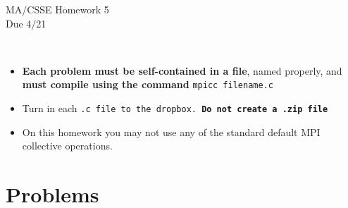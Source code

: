 \documentclass{article}
\begin{document}
\begin{center}
\Large{MA/CSSE Homework 5}\\
Due 4/21
\end{center}
\vspace{.25in}
\\
  \begin{itemize}
   \item \textbf{Each problem must be self-contained in a file}, named
     properly, and \textbf{must compile using the
      command} \texttt{mpicc filename.c}\\

  \item Turn in each \tt{.c} file to the dropbox. \textbf{Do not
      create a \tt{.zip} file}

  \item On this homework you may not use any of the standard default
    MPI collective operations. 
  \end{itemize}


\section*{Problems}
\end{document}
